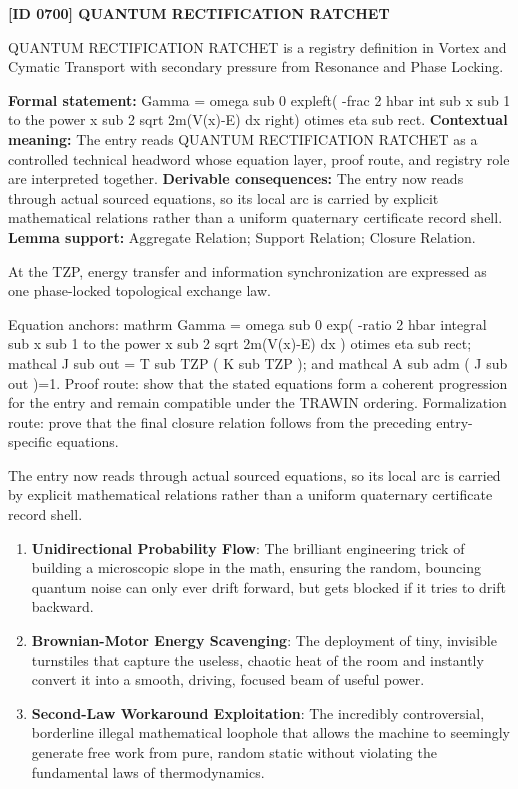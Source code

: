 \clearpage
\noindent\textbf{[ID 0700] QUANTUM RECTIFICATION RATCHET}\par
\vspace{0.35em}
\begingroup\small
{}
QUANTUM RECTIFICATION RATCHET is a registry definition in Vortex and Cymatic Transport with secondary pressure from Resonance and Phase Locking.

\begingroup\footnotesize\setlength{\emergencystretch}{3em}\sloppy
\textbf{Formal statement:} Gamma = omega sub 0 expleft( -frac 2 hbar int sub x sub 1 to the power x sub 2 sqrt 2m(V(x)-E) dx right) otimes eta sub rect. \textbf{Contextual meaning:} The entry reads QUANTUM RECTIFICATION RATCHET as a controlled technical headword whose equation layer, proof route, and registry role are interpreted together. \textbf{Derivable consequences:} The entry now reads through actual sourced equations, so its local arc is carried by explicit mathematical relations rather than a uniform quaternary certificate record shell. \textbf{Lemma support:} Aggregate Relation; Support Relation; Closure Relation.\par
\endgroup

At the TZP, energy transfer and information synchronization are expressed as one phase-locked topological exchange law.

Equation anchors: mathrm Gamma = omega sub 0 exp( -ratio 2 hbar integral sub x sub 1 to the power x sub 2 sqrt 2m(V(x)-E) dx ) otimes eta sub rect; mathcal J sub out = T sub TZP ( K sub TZP ); and mathcal A sub adm ( J sub out )=1. Proof route: show that the stated equations form a coherent progression for the entry and remain compatible under the TRAWIN ordering. Formalization route: prove that the final closure relation follows from the preceding entry-specific equations.

The entry now reads through actual sourced equations, so its local arc is carried by explicit mathematical relations rather than a uniform quaternary certificate record shell.
\endgroup

\begin{enumerate}[leftmargin=1.6em,itemsep=6pt,topsep=4pt]
\item \textbf{Unidirectional Probability Flow}: The brilliant engineering trick of building a microscopic slope in the math, ensuring the random, bouncing quantum noise can only ever drift forward, but gets blocked if it tries to drift backward.
\item \textbf{Brownian-Motor Energy Scavenging}: The deployment of tiny, invisible turnstiles that capture the useless, chaotic heat of the room and instantly convert it into a smooth, driving, focused beam of useful power.
\item \textbf{Second-Law Workaround Exploitation}: The incredibly controversial, borderline illegal mathematical loophole that allows the machine to seemingly generate free work from pure, random static without violating the fundamental laws of thermodynamics.
\end{enumerate}

